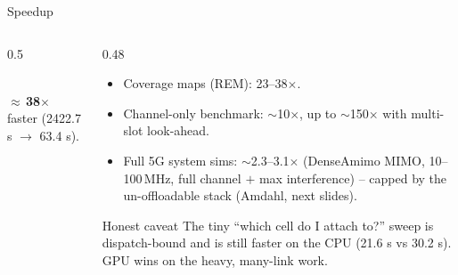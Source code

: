 \documentclass[aspectratio=169,11pt]{beamer}
\begin{document}
\begin{frame}{Speedup}
  \begin{columns}[c]
  \begin{column}{0.5\textwidth}
    \centering
    \\[-0.2em]
    {\scriptsize $\approx$\,\textbf{38$\times$} faster (2422.7 s $\to$ 63.4 s).}
  \end{column}
  \begin{column}{0.48\textwidth}
    \begin{itemize}\small
      \item Coverage maps (REM): \alert{23--38$\times$}.
      \item Channel-only benchmark: \alert{$\sim$10$\times$}, up to
            \alert{$\sim$150$\times$} with multi-slot look-ahead.
      \item Full 5G system sims: \alert{$\sim$2.3--3.1$\times$} (DenseAmimo MIMO,
            10--100\,MHz, full channel $+$ max interference) -- capped by the
            un-offloadable stack (Amdahl, next slides).
    \end{itemize}
    \vspace{0.3em}
    \begin{block}{Honest caveat}
      The tiny ``which cell do I attach to?'' sweep is dispatch-bound and is
      \alert{still faster on the CPU} (21.6 s vs 30.2 s). GPU wins on the
      \alert{heavy, many-link} work.
    \end{block}
  \end{column}
  \end{columns}
\end{frame}
\end{document}
